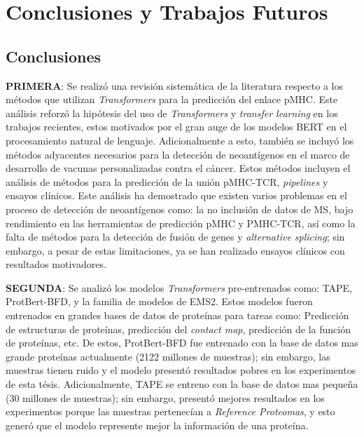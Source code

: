 \chapter{Conclusiones y Trabajos Futuros}
\label{cap:conclusiones}


\section{Conclusiones}

\textbf{PRIMERA}: Se realizó una revisión sistemática de la literatura respecto a los métodos que utilizan \textit{Transformers} para la predicción del enlace pMHC. Este análisis reforzó la hipótesis del uso de \textit{Transformers} y \textit{transfer learning} en los trabajos  recientes, estos motivados por el gran auge de los modelos BERT en el procesamiento natural de lenguaje. Adicionalmente a esto, también se incluyó los métodos adyacentes necesarios para la detección de neoantígenos en el marco de desarrollo de vacunas personalizadas contra el cáncer. Estos métodos incluyen el análisis de métodos para la predicción de la unión pMHC-TCR, \textit{pipelines} y ensayos clínicos. Este análisis ha demostrado que existen varios problemas en el proceso de detección de neoantígenos como: la no inclusión de datos de MS, bajo rendimiento en las herramientas de predicción pMHC y PMHC-TCR, así como la falta de métodos para la detección de fusión de genes y \textit{alternative splicing}; sin embargo, a pesar de estas limitaciones, ya se han realizado ensayos clínicos con resultados motivadores.

\textbf{SEGUNDA}: Se analizó los modelos \textit{Transformers} pre-entrenados como: TAPE, ProtBert-BFD, y la familia de modelos de EMS2. Estos modelos fueron entrenados en grandes bases de datos de proteínas para tareas como: Predicción de estructuras de proteínas, predicción del \textit{contact map}, predicción de la función de proteínas, etc. De estos, ProtBert-BFD fue entrenado con la base de datos mas grande proteínas actualmente (2122 millones de muestras); sin embargo, las muestras tienen ruido y  el modelo presentó resultados pobres en los experimentos de esta tésis. Adicionalmente, TAPE se entreno con la base de datos mas pequeña (30 millones de muestras); sin embargo, presentó mejores resultados en los experimentos porque las muestras pertenecían a \textit{Reference Proteomas}, y esto generó que el modelo represente mejor la información de una proteína.

